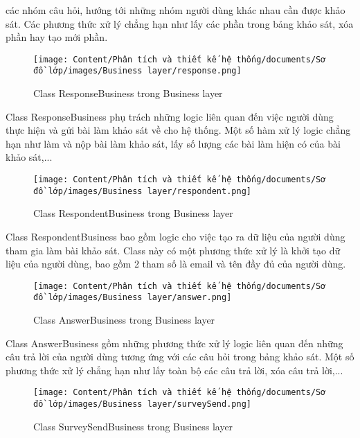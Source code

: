 các nhóm câu hỏi, hướng tới những nhóm người dùng khác nhau cần được khảo sát. Các phương thức xử lý chẳng hạn như lấy các phần trong bảng khảo sát, xóa phần hay tạo mới phần.
\begin{figure}[H]
    \centering
    \texttt{[image: Content/Phân tích và thiết kế hệ thống/documents/Sơ đồ lớp/images/Business layer/response.png]}
    \vspace{0.5cm}
    \caption{Class ResponseBusiness trong Business layer}
    \label{fig:Class ResponseBusiness trong Business layer}
\end{figure}
\par
Class ResponseBusiness phụ trách những logic liên quan đến việc người dùng thực hiện và gửi bài làm khảo sát về cho hệ thống. 
Một số hàm xử lý logic chẳng hạn như làm và nộp bài làm khảo sát, lấy số lượng các bài làm hiện có của bài khảo sát,...
\begin{figure}[H]
    \centering
    \texttt{[image: Content/Phân tích và thiết kế hệ thống/documents/Sơ đồ lớp/images/Business layer/respondent.png]}
    \vspace{0.5cm}
    \caption{Class RespondentBusiness trong Business layer}
    \label{fig:Class RespondentBusiness trong Business layer}
\end{figure}
\par
Class RespondentBusiness bao gồm logic cho việc tạo ra dữ liệu của người dùng tham gia làm bài khảo sát. Class này có một phương thức xử lý là khởi 
tạo dữ liệu của người dùng, bao gồm 2 tham số là email và tên đầy đủ của người dùng.
\begin{figure}[H]
    \centering
    \texttt{[image: Content/Phân tích và thiết kế hệ thống/documents/Sơ đồ lớp/images/Business layer/answer.png]}
    \vspace{0.5cm}
    \caption{Class AnswerBusiness trong Business layer}
    \label{fig:Class AnswerBusiness trong Business layer}
\end{figure}
\par
Class AnswerBusiness gồm những phương thức xử lý logic liên quan đến những câu trả lời của người dùng tương ứng với các câu hỏi trong bảng khảo sát. 
Một số phương thức xử lý chẳng hạn như lấy toàn bộ các câu trả lời, xóa câu trả lời,...
\begin{figure}[H]
    \centering
    \texttt{[image: Content/Phân tích và thiết kế hệ thống/documents/Sơ đồ lớp/images/Business layer/surveySend.png]}
    \vspace{0.5cm}
    \caption{Class SurveySendBusiness trong Business layer}
    \label{fig:Class SurveySendBusiness trong Business layer}
\end{figure}
